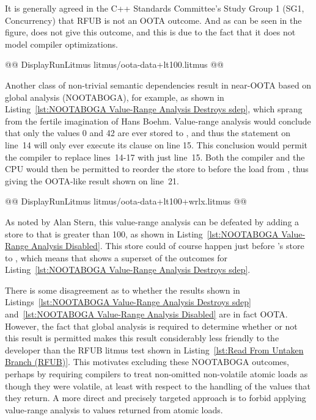 \documentclass[10]{article}
\begin{document}
It is generally agreed in the C++ Standards Committee's Study Group 1
(SG1, Concurrency) that RFUB is not an OOTA outcome.
And as can be seen in the figure,  does not give this outcome,
and this is due to the fact that it does not model compiler optimizations.

\begin{listing}[tbp]
@@ DisplayRunLitmus litmus/oota-data+lt100.litmus @@
\caption{NOOTABOGA Value-Range Analysis Destroys sdep}
\label{lst:NOOTABOGA Value-Range Analysis Destroys sdep}
\end{listing}

Another class of non-trivial semantic dependencies result in near-OOTA
based on global analysis (NOOTABOGA), for example, as shown
in Listing~\ref{lst:NOOTABOGA Value-Range Analysis Destroys sdep},
which sprang from the fertile imagination of Hans Boehm.
Value-range analysis would conclude that only the values 0 and 42 are
ever stored to , and thus the  statement on line~14 will
only ever execute its  clause on line 15.
This conclusion would permit the compiler to replace lines~14-17 with
just line~15.
Both the compiler and the CPU would then be permitted to reorder the store
to  before the load from , thus giving the OOTA-like result
shown on line~21.

\begin{listing}[tbp]
@@ DisplayRunLitmus litmus/oota-data+lt100+wrlx.litmus @@
\caption{NOOTABOGA Value-Range Analysis Disabled}
\label{lst:NOOTABOGA Value-Range Analysis Disabled}
\end{listing}

As noted by Alan Stern, this value-range analysis can be defeated by
adding a store to  that is greater than 100, as shown in
Listing~\ref{lst:NOOTABOGA Value-Range Analysis Disabled}.
This store could of course happen just before 's store to ,
which means that  shows a superset of the outcomes for
Listing~\ref{lst:NOOTABOGA Value-Range Analysis Destroys sdep}.

There is some disagreement as to whether the results shown in
Listings~\ref{lst:NOOTABOGA Value-Range Analysis Destroys sdep}
and~\ref{lst:NOOTABOGA Value-Range Analysis Disabled}
are in fact OOTA.
However, the fact that global analysis is required to determine whether
or not this result is permitted makes this result considerably less
friendly to the developer than the RFUB litmus test shown in
Listing~\ref{lst:Read From Untaken Branch (RFUB)}.
This motivates excluding these NOOTABOGA outcomes, perhaps by requiring
compilers to treat non-omitted non-volatile atomic loads as though they
were volatile, at least with respect to the handling of the values that
they return.
A more direct and precisely targeted approach is to forbid applying
value-range analysis to values returned from atomic loads.
\end{document}
